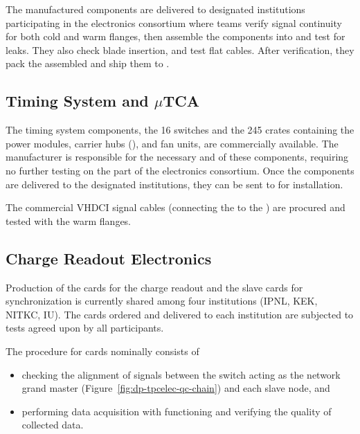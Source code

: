 The manufactured components are delivered to designated institutions participating in the \dual electronics consortium where teams verify signal continuity for both cold and warm flanges, then assemble the components into  and test for leaks. They also check blade insertion, and test flat cables.%
After verification, they pack the assembled  and ship them to . 

\subsection{Timing System and $\mu$TCA}
\label{ssec:dp-tpcelec-prod-utca}

The timing system components, the  \num{16}  switches and the \num{245}  crates containing the power modules, carrier hubs (), and fan units, are commercially available. The manufacturer is responsible for the necessary  and   of these components, requiring no further testing on the part of the \dual electronics consortium. Once the components are delivered to the designated institutions, they can be sent to  for installation. 

The commercial VHDCI signal cables (connecting the  to the ) are procured and tested with the  warm flanges.

\subsection{Charge Readout Electronics}
\label{ssec:dp-tpcelec-prod-cro}

Production of the  cards for the charge readout and the  slave cards for synchronization is currently shared among four institutions (IPNL, KEK, NITKC, IU). The cards ordered and delivered to each institution are subjected to   tests agreed upon by all participants. 

The  procedure for  cards nominally consists of 
\begin{itemize}
\item{checking the alignment of  signals between the  switch acting as the network grand master (Figure~\ref{fig:dp-tpcelec-qc-chain}) and each  slave node, and }
\item{performing data acquisition with functioning  and verifying the quality of collected data.}
\end{itemize}

